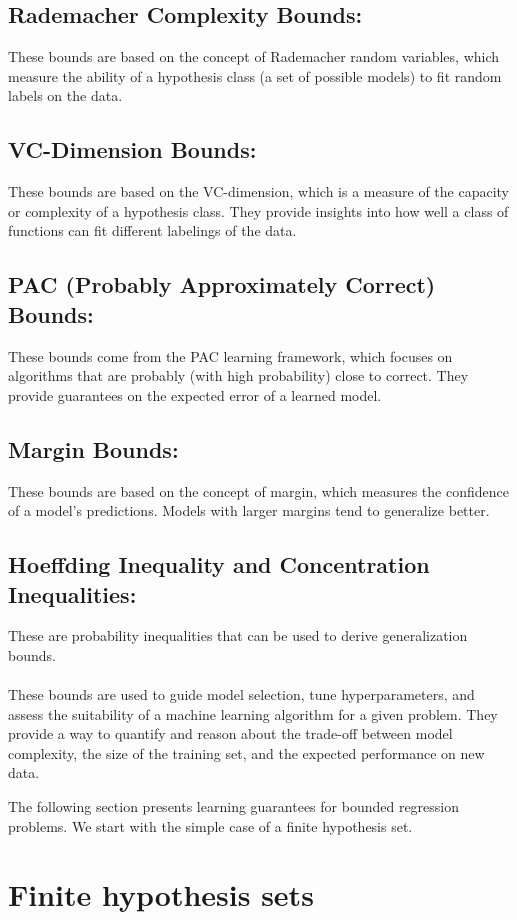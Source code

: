 \documentclass[fleqn,10pt]{olplainarticle}
\begin{document}
\subsection{Rademacher Complexity Bounds:} These bounds are based on the concept of Rademacher random variables, which measure the ability of a hypothesis class (a set of possible models) to fit random labels on the data.
\subsection{VC-Dimension Bounds:} These bounds are based on the VC-dimension, which is a measure of the capacity or complexity of a hypothesis class. They provide insights into how well a class of functions can fit different labelings of the data.
\subsection{PAC (Probably Approximately Correct) Bounds:} These bounds come from the PAC learning framework, which focuses on algorithms that are probably (with high probability) close to correct. They provide guarantees on the expected error of a learned model.
\subsection{Margin Bounds:} These bounds are based on the concept of margin, which measures the confidence of a model's predictions. Models with larger margins tend to generalize better.
\subsection{Hoeffding Inequality and Concentration Inequalities:} These are probability inequalities that can be used to derive generalization bounds.
\\\\
These bounds are used to guide model selection, tune hyperparameters, and assess the suitability of a machine learning algorithm for a given problem. They provide a way to quantify and reason about the trade-off between model complexity, the size of the training set, and the expected performance on new data.

The following section presents learning guarantees for bounded regression problems. We start with the simple case of a finite hypothesis set.

\section{Finite hypothesis sets}
\end{document}
